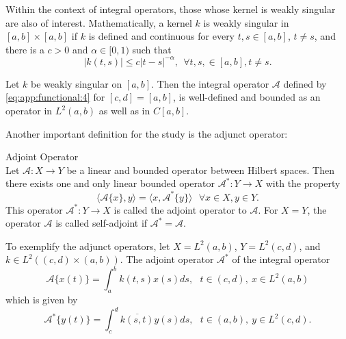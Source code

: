 			Within the context of integral operators, those whose kernel is weakly singular are also of interest. Mathematically, a kernel $k$ is weakly singular in$[a,b]\times[a,b]$ if $k$ is defined and continuous for every $t,s\in[a,b]$, $t\neq s$, and there is a $c>0$ and $\alpha\in[0,1)$ such that $$|k(t,s)|\le c|t-s|^{-\alpha},~~\forall t,s,\in[a,b], t\neq s.$$
			\begin{theorem}\label{the:app:functional:7}
				Let $k$ be weakly singular on $[a,b]$. Then the integral operator $\mathcal{A}$ defined by \eqref{eq:app:functional:4} for $[c,d]=[a,b]$, is well-defined and bounded as an operator in $L^2(a,b)$ as well as in $C[a,b]$.
			\end{theorem} 
		
			Another important definition for the study is the adjunct operator:
			\begin{theorem}\label{the:app:functional:8}
				Adjoint Operator\\
				Let $\mathcal{A}:X\rightarrow Y$ be a linear and bounded operator between Hilbert spaces. Then there exists one and only linear bounded operator $\mathcal{A}^*:Y\rightarrow X$ with the property $$ \langle \mathcal{A}\{x\},y \rangle = \langle x, \mathcal{A}^*\{y\} \rangle ~~~\forall x \in X, y \in Y. $$ This operator $\mathcal{A}^* : Y \rightarrow X$ is called the adjoint operator to $\mathcal{A}$. For $X = Y$, the operator $\mathcal{A}$ is called self-adjoint if $\mathcal{A}^*=\mathcal{A}$. 
			\end{theorem}
		
			To exemplify the adjunct operators, let $X = L^2(a,b)$, $Y=L^2(c,d)$, and $k\in L^2((c,d)\times(a,b))$. The adjoint operator $\mathcal{A}^*$ of the integral operator $$ \mathcal{A}\{x(t)\} = \int_a^b k(t,s)x(s)ds,~~~ t\in(c,d),~ x\in L^2(a,b) $$ which is given by $$\mathcal{A}^*\{y(t)\} = \int_c^d \overline{k(s,t)}y(s)ds,~~~ t\in(a,b),~y\in L^2(c,d).$$
			
